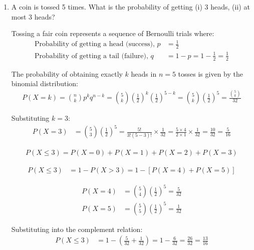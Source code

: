 \begin{enumerate}[label=\thesubsection.\arabic*, ref=\thesubsection.\theenumi]
Since volume is a non-negative scalar quantity:
\begin{align*}
	V = | -264 | = 264\text{ cubic units}
\end{align*}

Therefore, the volume of the given solid is 264 cubic units.



\item A coin is tossed 5 times. What is the probability of getting (i) 3 heads, (ii) at most 3 heads?

\solution
Tossing a fair coin represents a sequence of Bernoulli trials where:
\begin{align*}
	\text{Probability of getting a head (success), } p &= \frac{1}{2} \\
	\text{Probability of getting a tail (failure), } q &= 1 - p = 1 - \frac{1}{2} = \frac{1}{2}
\end{align*}

The probability of obtaining exactly $k$ heads in $n = 5$ tosses is given by the binomial distribution:
\begin{align*}
	P(X = k) = \binom{n}{k} p^k q^{n-k} = \binom{5}{k} \left(\frac{1}{2}\right)^k \left(\frac{1}{2}\right)^{5-k} = \binom{5}{k} \left(\frac{1}{2}\right)^5 = \frac{\binom{5}{k}}{32}
\end{align*}

Substituting $k = 3$:
\begin{align*}
	P(X = 3) &= \binom{5}{3} \left(\frac{1}{2}\right)^5 = \frac{5!}{3!(5-3)!} \times \frac{1}{32} = \frac{5 \times 4}{2 \times 1} \times \frac{1}{32} = \frac{10}{32} = \frac{5}{16}
\end{align*}

\begin{align*}
	P(X \le 3) = P(X = 0) + P(X = 1) + P(X = 2) + P(X = 3)
\end{align*}

\begin{align*}
	P(X \le 3) &= 1 - P(X > 3) = 1 - \left[ P(X = 4) + P(X = 5) \right]
\end{align*}

\begin{align*}
	P(X = 4) &= \binom{5}{4} \left(\frac{1}{2}\right)^5 = \frac{5}{32} \\
	P(X = 5) &= \binom{5}{5} \left(\frac{1}{2}\right)^5 = \frac{1}{32}
\end{align*}

Substituting into the complement relation:
\begin{align*}
	P(X \le 3) &= 1 - \left(\frac{5}{32} + \frac{1}{32}\right) = 1 - \frac{6}{32} = \frac{26}{32} = \frac{13}{16}
\end{align*}


\end{enumerate}
